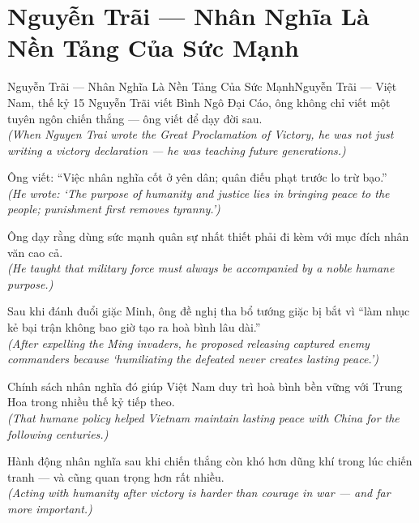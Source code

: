 \section{Nguyễn Trãi --- Nhân Nghĩa Là Nền Tảng Của Sức Mạnh}
\begin{truyen}{Nguyễn Trãi --- Nhân Nghĩa Là Nền Tảng Của Sức Mạnh}{Nguyễn Trãi --- Việt Nam, thế kỷ 15}
 Nguyễn Trãi viết Bình Ngô Đại Cáo, ông không chỉ viết một tuyên ngôn chiến thắng --- ông viết để dạy đời sau.\\[4pt]
\textit{(When Nguyen Trai wrote the Great Proclamation of Victory, he was not just writing a victory declaration --- he was teaching future generations.)}

Ông viết: ``Việc nhân nghĩa cốt ở yên dân; quân điếu phạt trước lo trừ bạo.''\\[4pt]
\textit{(He wrote: `The purpose of humanity and justice lies in bringing peace to the people; punishment first removes tyranny.')}

Ông dạy rằng dùng sức mạnh quân sự nhất thiết phải đi kèm với mục đích nhân văn cao cả.\\[4pt]
\textit{(He taught that military force must always be accompanied by a noble humane purpose.)}

Sau khi đánh đuổi giặc Minh, ông đề nghị tha bổ tướng giặc bị bắt vì ``làm nhục kẻ bại trận không bao giờ tạo ra hoà bình lâu dài.''\\[4pt]
\textit{(After expelling the Ming invaders, he proposed releasing captured enemy commanders because `humiliating the defeated never creates lasting peace.')}

Chính sách nhân nghĩa đó giúp Việt Nam duy trì hoà bình bền vững với Trung Hoa trong nhiều thế kỷ tiếp theo.\\[4pt]
\textit{(That humane policy helped Vietnam maintain lasting peace with China for the following centuries.)}

\end{truyen}
\begin{baihoc}
  Hành động nhân nghĩa sau khi chiến thắng còn khó hơn dũng khí trong lúc chiến tranh --- và cũng quan trọng hơn rất nhiều.\\[4pt]
  \textit{(Acting with humanity after victory is harder than courage in war --- and far more important.)}
\end{baihoc}

